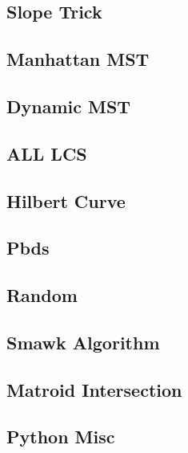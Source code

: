 \subsection{Slope Trick}

\subsection{Manhattan MST}

\subsection{Dynamic MST}

\subsection{ALL LCS}

\subsection{Hilbert Curve}

\subsection{Pbds}

\subsection{Random}

\subsection{Smawk Algorithm}

% 
\subsection{Matroid Intersection}

\subsection{Python Misc}
